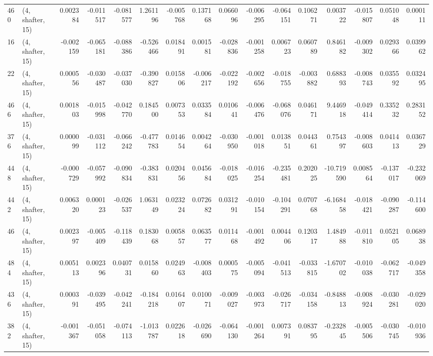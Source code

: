 \begin{tabular}{llrrrrrrrrrrrrrr}
460 &  (4, shafter, 15) &   0.002384 & -0.011517 & -0.081577 &    1.261196 & -0.005768 &   0.137168 &  0.066096 & -0.006295 & -0.064151 &  0.106271 &    0.003722 & -0.015807 &  0.051048 &  0.000111 \\
16  &  (4, shafter, 15) &  -0.002159 & -0.065181 & -0.088386 &   -0.526466 &  0.018491 &   0.001581 & -0.028836 & -0.001258 &  0.006723 &  0.060789 &    0.846182 & -0.009302 &  0.029366 &  0.039962 \\
22  &  (4, shafter, 15) &   0.000556 & -0.030487 & -0.037030 &   -0.390827 &  0.015806 &  -0.006217 & -0.022192 & -0.002656 & -0.018755 & -0.003882 &    0.688393 & -0.008743 &  0.035592 &  0.032495 \\
466 &  (4, shafter, 15) &   0.001803 & -0.015998 & -0.042770 &    0.184500 &  0.007353 &   0.033584 &  0.010641 & -0.006476 & -0.068076 &  0.046171 &    9.446918 & -0.049414 &  0.335232 &  0.283152 \\
376 &  (4, shafter, 15) &   0.000099 & -0.031112 & -0.066242 &   -0.477783 &  0.014654 &   0.004264 & -0.030950 & -0.001018 &  0.013851 &  0.044361 &    0.754397 & -0.008603 &  0.041413 &  0.036729 \\
448 &  (4, shafter, 15) &  -0.000729 & -0.057992 & -0.090834 &   -0.383831 &  0.020456 &   0.045684 & -0.018025 & -0.016254 & -0.235481 &  0.202025 &  -10.719590 &  0.008564 & -0.137017 & -0.232069 \\
442 &  (4, shafter, 15) &   0.006320 &  0.000123 & -0.026537 &    1.063149 &  0.023224 &   0.072682 &  0.031291 & -0.010154 & -0.104291 &  0.070768 &   -6.168458 & -0.018421 & -0.090287 & -0.114600 \\
46  &  (4, shafter, 15) &   0.002397 & -0.005409 & -0.118439 &    0.183068 &  0.005857 &   0.063577 &  0.011468 & -0.001492 &  0.004406 &  0.120317 &    1.484988 & -0.011810 &  0.052105 &  0.068938 \\
484 &  (4, shafter, 15) &   0.005113 &  0.002396 &  0.040731 &    0.015860 &  0.024963 &  -0.008403 &  0.000575 & -0.005094 & -0.041513 & -0.033815 &   -1.670702 & -0.010038 & -0.062717 & -0.049358 \\
436 &  (4, shafter, 15) &   0.000391 & -0.039495 & -0.042241 &   -0.184218 &  0.016407 &   0.010071 & -0.009027 & -0.003973 & -0.026717 & -0.034158 &   -0.848813 & -0.008924 & -0.030281 & -0.029020 \\
382 &  (4, shafter, 15) &  -0.001367 & -0.051058 & -0.074113 &   -1.013787 &  0.022618 &  -0.026690 & -0.064130 & -0.001264 &  0.007391 &  0.083795 &   -0.232845 & -0.005506 & -0.030745 & -0.010936 \\

\end{tabular}
